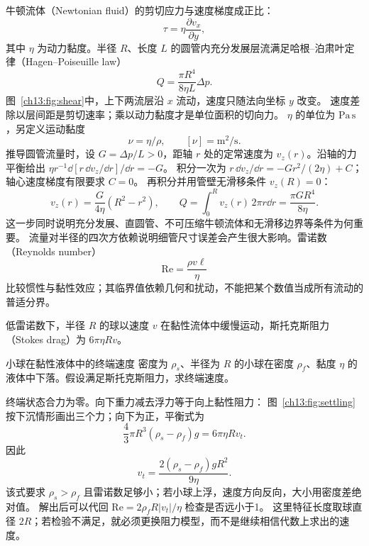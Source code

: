 牛顿流体（Newtonian fluid）的剪切应力与速度梯度成正比：
\begin{equation}
 \tau=\eta\frac{\partial v_x}{\partial y},
\end{equation}
其中 $\eta$ 为动力黏度。半径 $R$、长度 $L$ 的圆管内充分发展层流满足哈根--泊肃叶定律（Hagen--Poiseuille law）
\begin{equation}
 Q=\frac{\pi R^4}{8\eta L}\Delta p.
\end{equation}
\FluidShearDiagram
图~\ref{ch13:fig:shear}中，上下两流层沿 $x$ 流动，速度只随法向坐标 $y$ 改变。
速度差除以层间距是剪切速率；乘以动力黏度才是单位面积的切向力。
$\eta$ 的单位为 $\mathrm{Pa\,s}$，另定义运动黏度
\[
 \boxed{\nu=\eta/\rho},\qquad [\nu]=\mathrm{m^2/s}.
\]
推导圆管流量时，设 $G=\Delta p/L>0$，距轴 $r$ 处的定常速度为 $v_z(r)$。沿轴的力平衡给出
$\eta r^{-1}\dd[r\,\dd v_z/\dd r]/\dd r=-G$。
积分一次为 $r\,\dd v_z/\dd r=-Gr^2/(2\eta)+C$；轴心速度梯度有限要求 $C=0$。
再积分并用管壁无滑移条件 $v_z(R)=0$：
\[
 v_z(r)=\frac{G}{4\eta}(R^2-r^2),\qquad
 Q=\int_0^R v_z(r)\,2\pi r\dd r
 =\frac{\pi GR^4}{8\eta}.
\]
这一步同时说明充分发展、直圆管、不可压缩牛顿流体和无滑移边界等条件为何重要。
流量对半径的四次方依赖说明细管尺寸误差会产生很大影响。雷诺数（Reynolds number）
\begin{equation}
 \mathrm{Re}=\frac{\rho v\ell}{\eta}
\end{equation}
比较惯性与黏性效应；其临界值依赖几何和扰动，不能把某个数值当成所有流动的普适分界。

低雷诺数下，半径 $R$ 的球以速度 $v$ 在黏性流体中缓慢运动，斯托克斯阻力（Stokes drag）为 $6\pi\eta Rv$。

\begin{origexamplebox}{小球在黏性液体中的终端速度}\label{ch13:ex:settling}
密度为 $\rho_s$、半径为 $R$ 的小球在密度 $\rho_f$、黏度 $\eta$ 的液体中下落。假设满足斯托克斯阻力，求终端速度。
\end{origexamplebox}
\begin{xesolution}
终端状态合力为零。向下重力减去浮力等于向上黏性阻力：
\FluidSettlingDiagram
图~\ref{ch13:fig:settling}按下沉情形画出三个力；向下为正，平衡式为
\[
 \frac43\pi R^3(\rho_s-\rho_f)g=6\pi\eta Rv_t.
\]
因此
\[
 \boxed{v_t=\frac{2(\rho_s-\rho_f)gR^2}{9\eta}}.
\]
该式要求 $\rho_s>\rho_f$ 且雷诺数足够小；若小球上浮，速度方向反向，大小用密度差绝对值。
解出后可以代回 $\mathrm{Re}=2\rho_fR|v_t|/\eta$ 检查是否远小于1。
这里特征长度取球直径 $2R$；若检验不满足，就必须更换阻力模型，而不是继续相信代数上求出的速度。
\end{xesolution}

